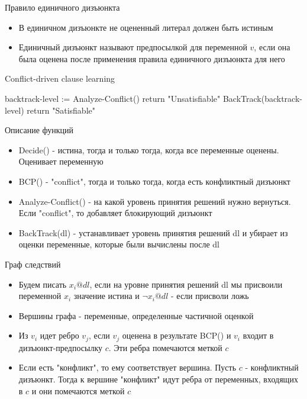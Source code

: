 \documentclass{beamer}
\begin{document}
\begin{frame}{Правило единичного дизъюнкта}
\begin{itemize}
\item В единичном дизъюнкте не оцененный литерал должен быть истиным
\item Единичный дизъюнкт называют предпосылкой для переменной $v$, если она была оценена после применения правила единичного
дизъюнкта для него
\end{itemize}
\end{frame}

\begin{frame}{Conflict-driven clause learning}
\begin{algorithmic}
            \State backtrack-level := Analyze-Conflict()
                \State return "Unsatisfiable"
            \EndIf
            \State BackTrack(backtrack-level)
                \State return "Satisfiable"
            \EndIf
        \EndWhile
    \EndWhile
\EndFunction
\end{algorithmic}
\end{frame}

\begin{frame}{Описание функций}
\begin{itemize}
\item Decide() - истина, тогда и только тогда, когда все переменные оценены. Оценивает переменную
\item BCP() - "conflict", тогда и только тогда, когда есть конфликтный дизъюнкт
\item Analyze-Conflict() - на какой уровень принятия решений нужно вернуться. Если "conflict", то добавляет блокирующий
дизъюнкт
\item BackTrack(dl) - устанавливает уровень принятия решений dl и убирает из оценки переменные, которые были вычислены после dl
\end{itemize}
\end{frame}

\begin{frame}{Граф следствий}
\begin{itemize}
\item Будем писать $x_i@dl$, если на уровне принятия решений dl мы присвоили переменной $x_i$ значение истина и $\lnot x_i@dl$ -
если присволи ложь
\item Вершины графа - переменные, определенные частичной оценкой
\item Из $v_i$ идет ребро $v_j$, если $v_j$ оценена в результате BCP() и $v_i$ входит в дизъюнкт-предпосылку $c$. Эти ребра
помечаются меткой $c$
\item Если есть "конфликт", то ему соответствует вершина. Пусть $c$ - конфликтный дизъюнкт. Тогда к вершине "конфликт" идут
ребра от переменных, входящих в $c$ и они помечаются меткой $c$
\end{itemize}
\end{frame}
\end{document}
